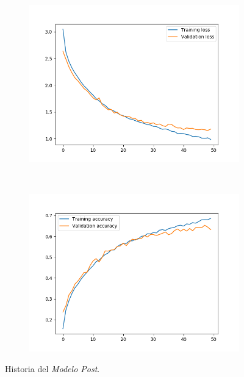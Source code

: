 \documentclass[11pt,a4paper]{article}
\begin{document}
\begin{figure}[H]
  \centering
  \begin{subfigure}{.5\textwidth}
    \includegraphics[scale=0.4]{img/batch-post-loss.png}
    \label{fig:batch-post-loss}
  \end{subfigure}%
  ~ \quad
  \begin{subfigure}{.5\textwidth}
    \includegraphics[scale=0.4]{img/batch-post-acc.png}
    \label{fig:batch-post-acc}
  \end{subfigure}
  \caption{Historia del \textit{Modelo Post}.}
  \label{fig:history-batch-post}
\end{figure}
\end{document}
